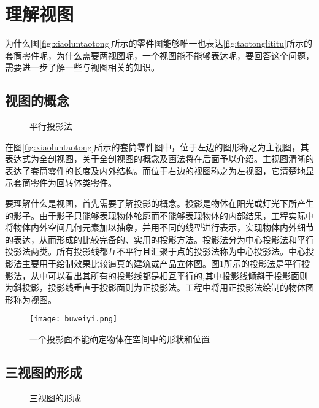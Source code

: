 \section{理解视图}\label{sec:lijieshitu}

为什么图\ref{fig:xiaoluntaotong}所示的零件图能够唯一也表达\ref{fig:taotonglititu}所示的套筒零件呢，为什么需要两视图呢，一个视图能不能够表达呢，要回答这个问题，需要进一步了解一些与视图相关的知识。
\subsection{视图的概念}
\begin{figure}[htbp]
\centering
{}\hspace{30pt}
\caption{平行投影法}\label{pingxingtouyin}
\end{figure}

 在图\ref{fig:xiaoluntaotong}所示的套筒零件图中，位于左边的图形称之为主视图，其表达式为全剖视图，关于全剖视图的概念及画法将在后面予以介绍。主视图清晰的表达了套筒零件的长度及内外结构。而位于右边的视图称之为左视图，它清楚地显示套筒零件为回转体类零件。

要理解什么是视图，首先需要了解投影的概念。投影是物体在阳光或灯光下所产生的影子。由于影子只能够表现物体轮廓而不能够表现物体的内部结果，工程实际中将物体内外空间几何元素加以抽象，并用不同的线型进行表示，实现物体内外细节的表达，从而形成的比较完备的、实用的投影方法。投影法分为中心投影法和平行投影法两类。所有投影线都互不平行且汇聚于点的投影法称为中心投影法。中心投影法主要用于绘制效果比较逼真的建筑或产品立体图。图\ref{pingxingtouyin}所示的投影法是平行投影法，从中可以看出其所有的投影线都是相互平行的,其中投影线倾斜于投影面则为斜投影，投影线垂直于投影面则为正投影法。工程中将用正投影法绘制的物体图形称为视图。
\begin{figure}[htbp]
\centering
\texttt{[image: buweiyi.png]}
\caption{一个投影面不能确定物体在空间中的形状和位置}\label{fig:singleprojection}
\end{figure}
\subsection{三视图的形成}

\begin{figure}[htbp]
\centering
{}
\hspace{30pt}


\hspace{30pt}
\caption{三视图的形成}
\end{figure}

